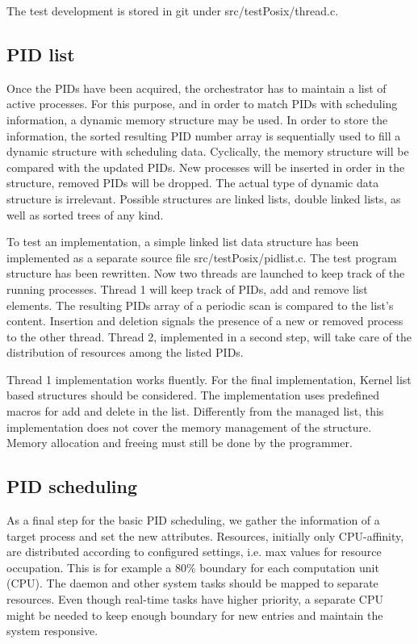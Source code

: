 \documentclass[]{scrartcl}
\begin{document}
The test development is stored in git under {src/testPosix/thread.c}.

\subsection{PID list}

Once the PIDs have been acquired, the orchestrator has to maintain a list of active processes. 
For this purpose, and in order to match PIDs with scheduling information, a dynamic memory structure may be used.
In order to store the information, the sorted resulting PID number array is sequentially used to fill a dynamic structure with scheduling data. 
Cyclically, the memory structure will be compared with the updated PIDs. New processes will be inserted in order in the structure, removed PIDs will be dropped.
The actual type of dynamic data structure is irrelevant. Possible structures are linked lists, double linked lists, as well as sorted trees of any kind.

To test an implementation, a simple linked list data structure has been implemented as a separate source file {src/testPosix/pidlist.c}.
The test program structure has been rewritten. Now two threads are launched to keep track of the running processes. 
Thread 1 will keep track of PIDs, add and remove list elements. The resulting PIDs array of a periodic scan is compared to the list's content.
Insertion and deletion signals the presence of a new or removed process to the other thread.
Thread 2, implemented in a second step, will take care of the distribution of resources among the listed PIDs. 

Thread 1 implementation works fluently. For the final implementation, Kernel list based structures should be considered. 
The implementation uses predefined macros for add and delete in the list. Differently from the managed list, this implementation does not cover the memory management of the structure. Memory allocation and freeing must still be done by the programmer.

\subsection{PID scheduling}
 
As a final step for the basic PID scheduling, we gather the information of a target process and set the new attributes. 
Resources, initially only {CPU}-affinity, are distributed according to configured settings, i.e. max values for resource occupation. 
This is for example a 80\% boundary for each computation unit ({CPU}). 
The daemon and other system tasks should be mapped to separate resources. Even though real-time tasks have higher priority, a separate CPU might be needed to keep enough boundary for new entries and maintain the system responsive.
\end{document}
